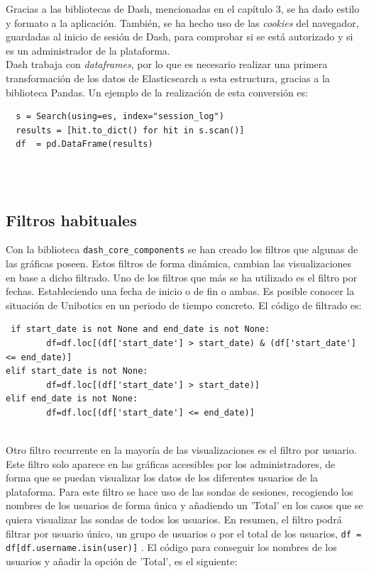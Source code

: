 Gracias a las bibliotecas de Dash, mencionadas en el capítulo 3, se ha dado estilo y formato a la aplicación. También, se ha hecho uso de las \textit{cookies }del navegador, guardadas al inicio de sesión de Dash, para comprobar si se está autorizado y si es un administrador de la plataforma.\\

Dash trabaja con \textit{dataframes}, por lo que es necesario realizar una primera transformación de los datos de Elasticsearch a esta estructura, gracias a la biblioteca Pandas. Un ejemplo de la realización de esta conversión es:

{\footnotesize
\begin{verbatim}
  s = Search(using=es, index="session_log")
  results = [hit.to_dict() for hit in s.scan()]
  df  = pd.DataFrame(results)
\end{verbatim}
}
\\
\\
\newpage
\subsection{Filtros habituales}
Con la biblioteca \texttt{dash\_core\_components} se han creado los filtros que algunas de las gráficas poseen. Estos filtros de forma dinámica, cambian las visualizaciones en base a dicho filtrado. Uno de los filtros que más se ha utilizado es el filtro por fechas. Estableciendo una fecha de inicio o de fin o ambas. Es posible conocer la situación de Unibotics en un periodo de tiempo concreto. El código de filtrado es:

{\footnotesize
\begin{verbatim}
 if start_date is not None and end_date is not None:
        df=df.loc[(df['start_date'] > start_date) & (df['start_date'] <= end_date)]
elif start_date is not None:
        df=df.loc[(df['start_date'] > start_date)]
elif end_date is not None:
        df=df.loc[(df['start_date'] <= end_date)]
\end{verbatim}
}
\\

Otro filtro recurrente en la mayoría de las visualizaciones es el filtro por usuario. Este filtro solo aparece en las gráficas accesibles por los administradores, de forma que se puedan visualizar los datos de los diferentes usuarios de la plataforma. Para este filtro se hace uso de las sondas de sesiones, recogiendo los nombres de los usuarios de forma única y añadiendo un 'Total' en los casos que se quiera visualizar las sondas de todos los usuarios. En resumen, el filtro podrá filtrar por usuario único, un grupo de usuarios o por el total de los usuarios, \newline\texttt{df = df[df.username.isin(user)]} . El código para conseguir los nombres de los usuarios y añadir la opción de 'Total', es el siguiente:

